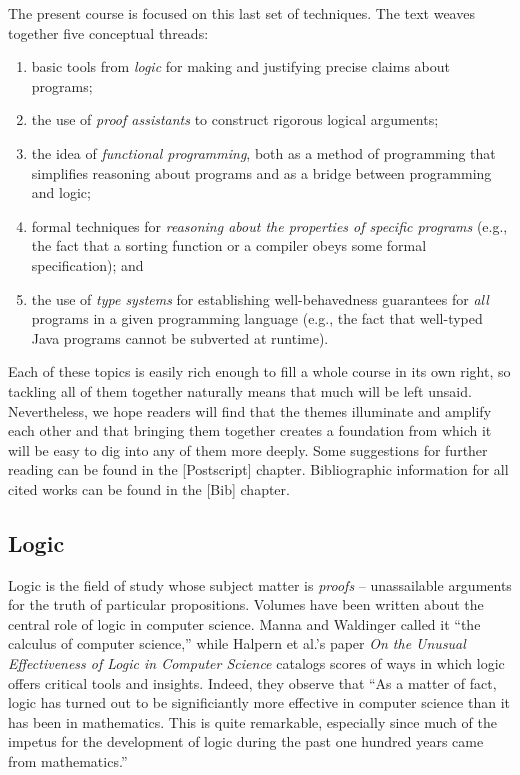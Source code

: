 The present course is focused on this last set of techniques. The text
weaves together five conceptual threads:

\begin{enumerate}
\def\labelenumi{\arabic{enumi}.}
\item
  basic tools from \emph{logic} for making and justifying precise claims
  about programs;
\item
  the use of \emph{proof assistants} to construct rigorous logical
  arguments;
\item
  the idea of \emph{functional programming}, both as a method of
  programming that simplifies reasoning about programs and as a bridge
  between programming and logic;
\item
  formal techniques for \emph{reasoning about the properties of specific
  programs} (e.g., the fact that a sorting function or a compiler obeys
  some formal specification); and
\item
  the use of \emph{type systems} for establishing well-behavedness
  guarantees for \emph{all} programs in a given programming language
  (e.g., the fact that well-typed Java programs cannot be subverted at
  runtime).
\end{enumerate}

Each of these topics is easily rich enough to fill a whole course in its
own right, so tackling all of them together naturally means that much
will be left unsaid. Nevertheless, we hope readers will find that the
themes illuminate and amplify each other and that bringing them together
creates a foundation from which it will be easy to dig into any of them
more deeply. Some suggestions for further reading can be found in the
{[}Postscript{]} chapter. Bibliographic information for all cited works
can be found in the {[}Bib{]} chapter.

\subsection{Logic}\label{logic}

Logic is the field of study whose subject matter is \emph{proofs} --
unassailable arguments for the truth of particular propositions. Volumes
have been written about the central role of logic in computer science.
Manna and Waldinger called it ``the calculus of computer science,''
while Halpern et al.'s paper \emph{On the Unusual Effectiveness of Logic
in Computer Science} catalogs scores of ways in which logic offers
critical tools and insights. Indeed, they observe that ``As a matter of
fact, logic has turned out to be significiantly more effective in
computer science than it has been in mathematics. This is quite
remarkable, especially since much of the impetus for the development of
logic during the past one hundred years came from mathematics.''

